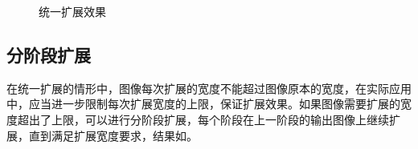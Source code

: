 \documentclass[11pt,a4paper]{article}
\begin{document}
\begin{figure}[H]
    \centering
    \caption{统一扩展效果}
    \label{fig:opt_expand}
\end{figure}

\subsection{分阶段扩展}

在统一扩展的情形中，图像每次扩展的宽度不能超过图像原本的宽度，在实际应用中，应当进一步限制每次扩展宽度的上限，保证扩展效果。如果图像需要扩展的宽度超出了上限，可以进行分阶段扩展，每个阶段在上一阶段的输出图像上继续扩展，直到满足扩展宽度要求，结果如。
\end{document}
